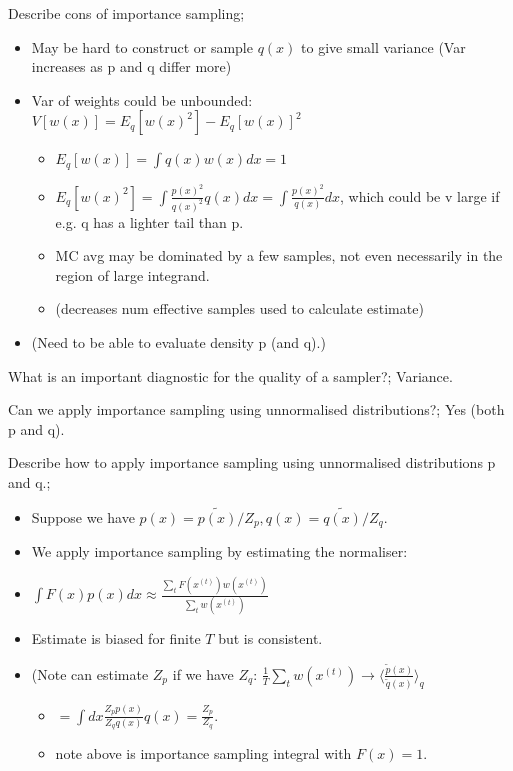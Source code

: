 \documentclass{article}
\begin{document}
Describe cons of importance sampling; \begin{itemize}
    \item May be hard to construct or sample $q(x)$ to give small variance (Var increases as p and q differ more)
    \item Var of weights could be unbounded: $V[w(x)] = E_q[w(x)^2] - E_q[w(x)]^2$
    \begin{itemize}
        \item $E_q[w(x)] = \int q(x)w(x)dx = 1$
        \item $E_q[w(x)^2] = \int \frac{p(x)^2}{q(x)^2}q(x)dx = \int \frac{p(x)^2}{q(x)}dx$, which could be v large if e.g. q has a lighter tail than p. 
        \item MC avg may be dominated by a few samples, not even necessarily in the region of large integrand.
        \item (decreases num effective samples used to calculate estimate)
    \end{itemize}
    \item (Need to be able to evaluate density p (and q).)
\end{itemize}

What is an important diagnostic for the quality of a sampler?; Variance.

Can we apply importance sampling using unnormalised distributions?; Yes (both p and q).

Describe how to apply importance sampling using unnormalised distributions p and q.; \begin{itemize}
    \item Suppose we have $p(x) = \tilde{p(x)}/Z_p, q(x) = \tilde{q(x)}/Z_q$.
    \item We apply importance sampling by estimating the normaliser:
    \item $\int F(x) p(x) dx \approx \frac{\sum_t F(x^{(t)})w(x^{(t)})}{\sum_t w(x^{(t)})}$
    \item Estimate is biased for finite $T$ but is consistent.
    \item (Note can estimate $Z_p$ if we have $Z_q$: $\frac{1}{T}\sum_t w(x^{(t)})\rightarrow \langle \frac{\tilde{p}(x)}{\tilde{q}(x)}\rangle_q$
    \begin{itemize}
        \item $=\int dx \frac{Z_p p(x)}{Z_q q(x)}q(x) = \frac{Z_p}{Z_q}$.
        \item note above is importance sampling integral with $F(x) = 1$.
    \end{itemize}
\end{itemize}
\end{document}
